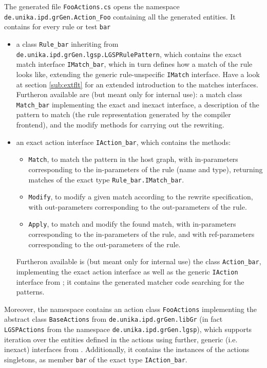 The generated file \texttt{FooActions.cs} opens the namespace \texttt{de.unika.ipd.grGen.Action\_Foo} containing all the generated entities.
It contains for every rule or test \texttt{bar}
\begin{itemize}
\item a class \texttt{Rule\_bar} inheriting from \texttt{de.unika.ipd.grGen.lgsp.LGSPRulePattern}, which contains
the exact match interface \texttt{IMatch\_bar}, which in turn defines how a match of the rule looks like,
extending the generic rule-unspecific \texttt{IMatch} interface.
Have a look at section \ref{sub:extflt} for an extended introduction to the matches interfaces. 
Furtheron available are (but meant only for internal use): a match class \texttt{Match\_bar} implementing the exact and inexact interface,
a description of the pattern to match (the rule representation generated by the compiler frontend), and the modify methods for carrying out the rewriting.

\item an exact action interface \texttt{IAction\_bar}, which contains the methods:
  \begin{itemize}
  \item \texttt{Match}, to match the pattern in the host graph,
     with in-parameters corresponding to the in-parameters of the rule (name and type),
	 returning matches of the exact type \texttt{Rule\_bar.IMatch\_bar}.
  \item \texttt{Modify}, to modify a given match according to the rewrite specification,
     with out-parameters corresponding to the out-parameters of the rule.
  \item \texttt{Apply}, to match and modify the found match,
     with in-parameters corresponding to the in-parameters of the rule,
     and with ref-parameters corresponding to the out-parameters of the rule.
  \end{itemize}
  Furtheron available is (but meant only for internal use) the class \texttt{Action\_bar}, implementing the exact action interface as well as the generic \texttt{IAction} interface from \LibGr;
  it contains the generated matcher code searching for the patterns.
\end{itemize}

Moreover, the namespace contains an action class \texttt{FooActions}
implementing the abstract class \texttt{BaseActions} from \texttt{de.unika.ipd.grGen.libGr} (in fact \texttt{LGSPActions} from the namespace \texttt{de.unika.ipd.grGen.lgsp}),
which supports iteration over the entities defined in the actions using further, generic (i.e. inexact) interfaces from \LibGr.
Additionally, it contains the instances of the actions singletons,
as member \texttt{bar} of the exact type \texttt{IAction\_bar}.

